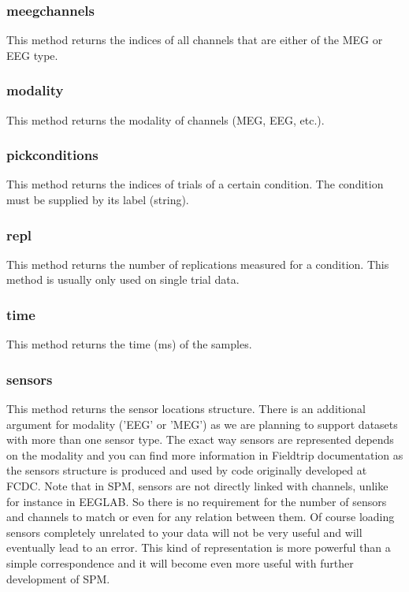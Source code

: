 \subsubsection{meegchannels}
This method returns the indices of all channels that are either of the MEG or EEG type.

\subsubsection{modality}
This method returns the modality of channels (MEG, EEG, etc.).

\subsubsection{pickconditions}
This method returns the indices of trials of a certain condition. The condition must be supplied by its label (string).

\subsubsection{repl}
This method returns the number of replications measured for a condition. This method is usually only used on single trial data.

\subsubsection{time}
This method returns the time (ms) of the samples.

\subsubsection{sensors}
This method returns the sensor locations structure. There is an additional argument for modality ('EEG' or 'MEG') as we are planning to support datasets with more than one sensor type. The exact way sensors are represented depends on the modality and you can find more information in Fieldtrip documentation as the sensors structure is produced and used by code originally developed at FCDC. Note that in SPM, sensors are not directly linked with channels, unlike for instance in EEGLAB. So there is no requirement for the number of sensors and channels to match or even for any relation between them. Of course loading sensors completely unrelated to your data will not be very useful and will eventually lead to an error. This kind of representation is more powerful than a simple correspondence and it will become even more useful with further development of SPM.

